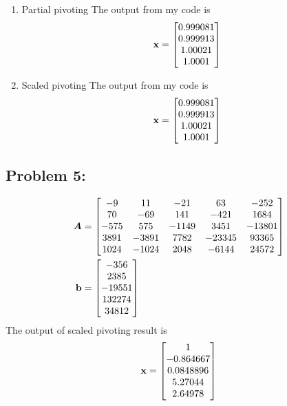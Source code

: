 \documentclass{article}
\begin{document}
\begin{enumerate}[label=(\alph*)]
\begin{enumerate}[label=(\roman*)] 
\item Partial pivoting 
The output from my code is \begin{align*} \boldsymbol{\mathrm{x}} = \begin{bmatrix} 0.999081 \\ 0.999913 \\ 1.00021 \\ 1.0001  \end{bmatrix} \end{align*} 
\item Scaled pivoting 
The output from my code is \begin{align*} \boldsymbol{\mathrm{x}} = \begin{bmatrix} 0.999081 \\ 0.999913 \\ 1.00021 \\ 1.0001  \end{bmatrix} \end{align*} 
\end{enumerate} 
\end{enumerate} 

\hypertarget{problem_0_homework_checklist_2}{}
\subsection*{{Problem 5: }}
\label{}
\begin{align*}
\boldsymbol{A} &= \begin{bmatrix} -9 & 11 & -21 & 63 & -252 \\ 
			70 & -69 & 141 & - 421 & 1684 \\
			-575 & 575 & -1149 & 3451 & -13801 \\
			3891 & -3891 & 7782 & -23345 & 93365 \\
			1024 & -1024 & 2048 & -6144 & 24572  \end{bmatrix}\\
\boldsymbol{\mathrm{b}} & = \begin{bmatrix} -356 \\ 2385 \\ -19551 \\ 132274 \\ 34812  \end{bmatrix}
\end{align*} 
The output of scaled pivoting result is \begin{align*} \boldsymbol{\mathrm{x}} = \begin{bmatrix} 1 \\ -0.864667 \\ 0.0848896 \\ 5.27044 \\ 2.64978 \end{bmatrix} \end{align*} 
\end{document}
